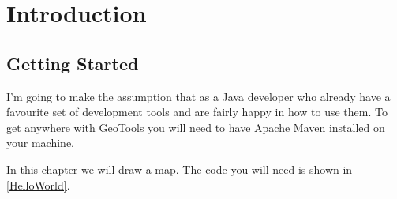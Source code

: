 \chapter{Introduction}\label{introduction}

\section{Getting Started}
I'm going to make the assumption that as a Java developer who already have a favourite set of development tools and are fairly happy in how to use them. To get anywhere with GeoTools you will need to have Apache Maven installed on your machine. 

In this chapter we will draw a map. The code you will need is shown in \cref{HelloWorld}.



